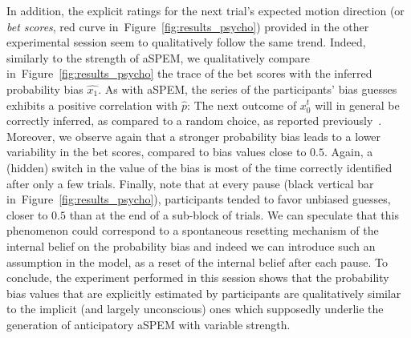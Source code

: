\documentclass[12pt,english]{article}%
\newcommand{\citep}[1]{\parencite{#1}}
\newcommand{\seeFig}[1]{Figure~\ref{fig:#1}}
\newcommand{\AM}[1]{\textbf{\textcolor{blue}{[AM: #1]}}}
\begin{document}
In addition, the explicit ratings
for the next trial's expected motion direction (or \textit{bet scores}, red curve in~\seeFig{results_psycho})
provided in the other experimental session
seem to qualitatively follow the same trend.
Indeed, similarly to the strength of aSPEM,
we qualitatively compare in~\seeFig{results_psycho}
the trace of the bet scores
with the inferred probability bias $\hat{x_1}$.
As with aSPEM, the series of the participants' bias guesses
exhibits a positive correlation with $\hat{p}$:
The next outcome of $x_{0}^{t}$ will in general be correctly inferred,
as compared to a random choice, as reported previously~\citep{Meyniel15}. %
Moreover, we observe again that a stronger probability bias leads 
to a lower variability in the bet scores, compared to bias values close to $0.5$.
Again, a (hidden) switch in the value of the bias is
most of the time correctly identified after only a few trials.
Finally, note that at every pause (black vertical bar in~\seeFig{results_psycho}),
participants tended to favor unbiased guesses, closer to $0.5$
than at the end of a sub-block of trials.
We can speculate that this phenomenon could correspond
to a spontaneous resetting mechanism of the internal belief on the probability bias 
and indeed we can introduce such an assumption in the model, %
as a reset of the internal belief after each pause. 
To conclude, the experiment performed in this session
shows that the probability bias values that are explicitly estimated by participants
are qualitatively similar to the implicit (and largely unconscious) ones
which supposedly underlie the generation of anticipatory aSPEM with variable strength.
\end{document}
